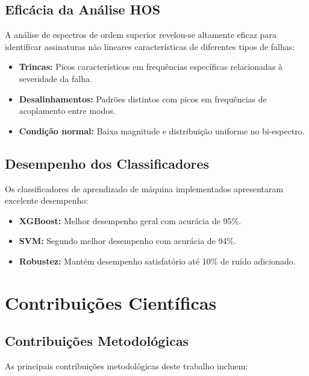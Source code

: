 \subsection{Eficácia da Análise HOS}

A análise de espectros de ordem superior revelou-se altamente eficaz para identificar assinaturas não lineares características de diferentes tipos de falhas:

\begin{itemize}
    \item \textbf{Trincas:} Picos característicos em frequências específicas relacionadas à severidade da falha.
    \item \textbf{Desalinhamentos:} Padrões distintos com picos em frequências de acoplamento entre modos.
    \item \textbf{Condição normal:} Baixa magnitude e distribuição uniforme no bi-espectro.
\end{itemize}

\subsection{Desempenho dos Classificadores}

Os classificadores de aprendizado de máquina implementados apresentaram excelente desempenho:

\begin{itemize}
    \item \textbf{XGBoost:} Melhor desempenho geral com acurácia de 95\%.
    \item \textbf{SVM:} Segundo melhor desempenho com acurácia de 94\%.
    \item \textbf{Robustez:} Mantém desempenho satisfatório até 10\% de ruído adicionado.
\end{itemize}

\section{Contribuições Científicas}

\subsection{Contribuições Metodológicas}

As principais contribuições metodológicas deste trabalho incluem:

